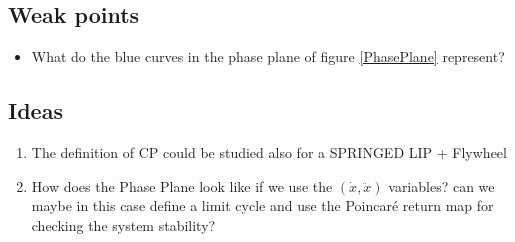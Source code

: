 \subsection*{Weak points}
\begin{itemize}
\item What do the blue curves in the phase plane of figure \ref{PhasePlane} represent?
\end{itemize}
\subsection*{Ideas}
\begin{enumerate}
\item The definition of CP could be studied also for a SPRINGED LIP + Flywheel
\item How does the Phase Plane look like if we use the $(\dot{x},\ddot{x})$ variables? can we maybe in this case define a limit cycle and use the Poincaré return map for checking the system stability?
\end{enumerate}
